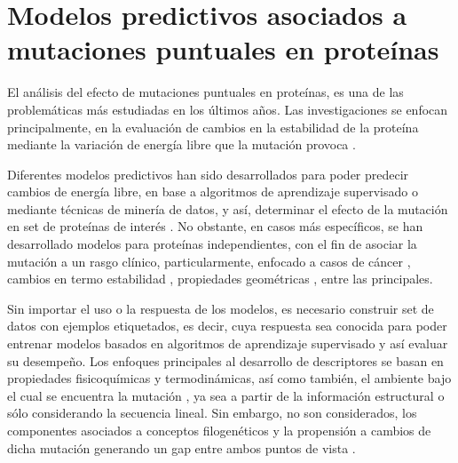 
\chapter{Modelos predictivos asociados a mutaciones puntuales en proteínas \label{cap2}}

\ifpdf
    \graphicspath{{Chapter2/Figs/Raster/}{Chapter2/Figs/PDF/}{Chapter2/Figs/}}
\else
    \graphicspath{{Chapter2/Figs/Vector/}{Chapter2/Figs/}}
\fi

El análisis del efecto de mutaciones puntuales en proteínas, es una de las problemáticas más estudiadas en los últimos años. Las investigaciones se enfocan principalmente, en la evaluación de cambios en la estabilidad de la proteína mediante la variación de energía libre que la mutación provoca \cite{Schymkowitz2005,Pandurangan2017,rohl2004protein,Parthiban2006}. 

Diferentes modelos predictivos han sido desarrollados para poder predecir cambios de energía libre, en base a algoritmos de aprendizaje supervisado o mediante técnicas de minería de datos, y así, determinar el efecto de la mutación en set de proteínas de interés \cite{Quan2016,Capriotti2008,Broom2017,Khan2010,vaisman,Getov2016,Capriotti2005}. No obstante, en casos más específicos, se han desarrollado modelos para proteínas independientes, con el fin de asociar la mutación a un rasgo clínico, particularmente, enfocado a casos de cáncer \cite{article, Forbes2010}, cambios en termo estabilidad \cite{Tian2010}, propiedades geométricas \cite{Barenboim2008}, entre las principales.

Sin importar el uso o la respuesta de los modelos, es necesario construir set de datos con ejemplos etiquetados, es decir, cuya respuesta sea conocida para poder entrenar modelos basados en algoritmos de aprendizaje supervisado y así evaluar su desempeño. Los enfoques principales al desarrollo de descriptores se basan en propiedades fisicoquímicas y termodinámicas, así como también, el ambiente bajo el cual se encuentra la mutación \cite{Capriotti2005}, ya sea a partir de la información estructural o sólo considerando la secuencia lineal. Sin embargo, no son considerados, los componentes asociados a conceptos filogenéticos y la propensión a cambios de dicha mutación generando un gap entre ambos puntos de vista \cite{Olivera-Nappa2011}.

